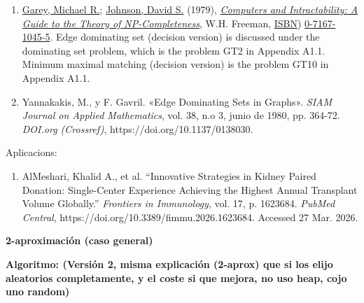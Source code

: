 \begin{enumerate}
\item \href{https://en.wikipedia.org/wiki/Michael\\\_R.\\\_Garey}{Garey, Michael R.}; \href{https://en.wikipedia.org/wiki/David\\\_S.\\\_Johnson}{Johnson, David S.} (1979), \href{https://en.wikipedia.org/wiki/Computers\\\_and\\\_Intractability:\\\_A\\\_Guide\\\_to\\\_the\\\_Theory\\\_of\\\_NP-Completeness}{\textit{Computers and Intractability: A Guide to the Theory of NP-Completeness}}, W.H. Freeman, \href{https://en.wikipedia.org/wiki/ISBN\\\_(identifier}{ISBN}) \href{https://en.wikipedia.org/wiki/Special:BookSources/0-7167-1045-5}{0-7167-1045-5}. Edge dominating set (decision version) is discussed under the dominating set problem, which is the problem GT2 in Appendix A1.1. Minimum maximal matching (decision version) is the problem GT10 in Appendix A1.1.
\item Yannakakis, M., y F. Gavril. «Edge Dominating Sets in Graphs». \textit{SIAM Journal on Applied Mathematics}, vol. 38, n.o 3, junio de 1980, pp. 364-72. \textit{DOI.org (Crossref)}, https://doi.org/10.1137/0138030.
\end{enumerate}

Aplicacions:

\begin{enumerate}
\item AlMeshari, Khalid A., et al. “Innovative Strategies in Kidney Paired Donation: Single-Center Experience Achieving the Highest Annual Transplant Volume Globally.” \textit{Frontiers in Immunology}, vol. 17, p. 1623684. \textit{PubMed Central}, https://doi.org/10.3389/fimmu.2026.1623684. Accessed 27 Mar. 2026.
\end{enumerate}

\textbf{2-aproximación (caso general)}

\textbf{Algoritmo: (Versión 2, misma explicación (2-aprox) que si los elijo aleatorios completamente, y el coste si que mejora, no uso heap, cojo uno random)}

